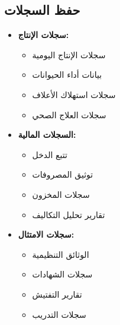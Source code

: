 \subsection{حفظ السجلات}
\begin{itemize}
    \item \textbf{سجلات الإنتاج:}
    \begin{itemize}
        \item سجلات الإنتاج اليومية
        \item بيانات أداء الحيوانات
        \item سجلات استهلاك الأعلاف
        \item سجلات العلاج الصحي
    \end{itemize}
    
    \item \textbf{السجلات المالية:}
    \begin{itemize}
        \item تتبع الدخل
        \item توثيق المصروفات
        \item سجلات المخزون
        \item تقارير تحليل التكاليف
    \end{itemize}
    
    \item \textbf{سجلات الامتثال:}
    \begin{itemize}
        \item الوثائق التنظيمية
        \item سجلات الشهادات
        \item تقارير التفتيش
        \item سجلات التدريب
    \end{itemize}
\end{itemize}
